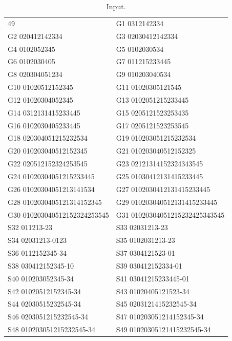 \documentclass[11pt]{article}
\theoremstyle{definition}
\theoremstyle{remark}
\begin{document}
\begin{table}[t]
    {\ttfamily
    \begin{tabularx}{\textwidth}{XX}
        49 & G1 0312142334 \\
        G2 020412142334 & G3 02030412142334 \\
        G4 0102052345 & G5 0102030534 \\
        G6 0102030405 & G7 011215233445 \\
        G8 020304051234 & G9 010203040534 \\
        G10 01020512152345 & G11 01020305121545 \\
        G12 01020304052345 & G13 0102051215233445 \\
        G14 0312131415233445 & G15 0205121523253435 \\
        G16 0102030405233445 & G17 0205121523253545 \\
        G18 020304051215232534 & G19 010203051215232534 \\
        G20 010203040512152345 & G21 010203040512152325 \\
        G22 020512152324253545 & G23 02121314152324343545 \\
        G24 01020304051215233445 & G25 01030412131415233445 \\
        G26 01020304051213141534 & G27 0102030412131415233445 \\
        G28 0102030405121314152345 & G29 010203040512131415233445 \\
        G30 010203040512152324253545 & G31 01020304051215232425343545 \\
        S32 011213-23 & S33 02031213-23 \\
        S34 02031213-0123 & S35 0102031213-23 \\
        S36 0112152345-34 & S37 0304121523-01 \\
        S38 030412152345-10 & S39 030412152334-01 \\
        S40 010203052345-34 & S41 03041215233445-01 \\
        S42 01020512152345-34 & S43 01020405121523-34 \\
        S44 02030515232545-34 & S45 0203121415232545-34 \\
        S46 0203051215232545-34 & S47 010203051214152345-34 \\
        S48 010203051215232545-34 & S49 01020305121415232545-34 \\
    \end{tabularx}}
    \caption{Input.} \label{table:input}
\end{table}
\end{document}
